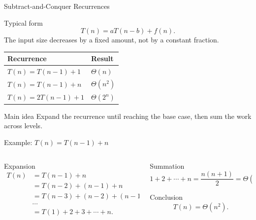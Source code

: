 \documentclass[aspectratio=169]{beamer}
\begin{document}
\begin{frame}{Subtract-and-Conquer Recurrences}
  \small
  \begin{block}{Typical form}
    \[
      T(n)=aT(n-b)+f(n).
    \]
    The input size decreases by a fixed amount, not by a constant fraction.
  \end{block}
  \begin{center}
    \renewcommand{\arraystretch}{1.2}
    \begin{tabular}{L{0.30\textwidth}L{0.38\textwidth}}
      \toprule
      \textbf{Recurrence} & \textbf{Result} \\
      \midrule
      $T(n)=T(n-1)+1$ & $\Theta(n)$ \\
      \addlinespace
      $T(n)=T(n-1)+n$ & $\Theta(n^2)$ \\
      \addlinespace
      $T(n)=2T(n-1)+1$ & $\Theta(2^n)$ \\
      \bottomrule
    \end{tabular}
  \end{center}
  \begin{alertblock}{Main idea}
    \centering\small
    Expand the recurrence until reaching the base case, then sum the work across levels.
  \end{alertblock}
\end{frame}

\begin{frame}{Example: $T(n)=T(n-1)+n$}
  \small
  \begin{columns}[T]
    \begin{column}{0.52\textwidth}
      \begin{block}{Expansion}
        \[
        \begin{aligned}
          T(n)&=T(n-1)+n\\
              &=T(n-2)+(n-1)+n\\
              &=T(n-3)+(n-2)+(n-1)+n\\
              &\cdots\\
              &=T(1)+2+3+\cdots+n.
        \end{aligned}
        \]
      \end{block}
    \end{column}
    \begin{column}{0.44\textwidth}
      \begin{exampleblock}{Summation}
        \[
          1+2+\cdots+n=\frac{n(n+1)}{2}=\Theta(n^2).
        \]
      \end{exampleblock}
      \begin{alertblock}{Conclusion}
        \[
          T(n)=\Theta(n^2).
        \]
      \end{alertblock}
    \end{column}
  \end{columns}
\end{frame}
\end{document}
